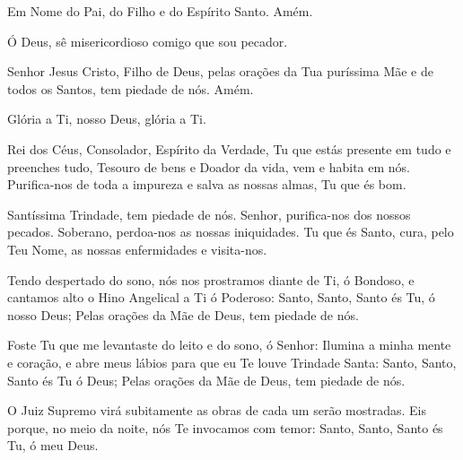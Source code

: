 \documentclass{subfiles}
\begin{document}
\pagestyle{empty}
{\centering}
\pagestyle{headings}

 
Em Nome do Pai, do Filho e do Espírito Santo. Amém. 
 
 
Ó Deus, sê misericordioso comigo que sou pecador. 
  
Senhor Jesus Cristo, Filho de Deus, pelas orações da Tua puríssima Mãe 
e de todos os Santos, tem piedade de nós. Amém. 
 
Glória a Ti, nosso Deus, glória a Ti. 
 
Rei dos Céus, Consolador, Espírito da Verdade, Tu que estás presente 
em tudo e preenches tudo, Tesouro de bens e Doador da vida, vem e habita 
em nós. Purifica-nos de toda a impureza e salva as nossas almas, Tu que és 
bom. 
 
\trisagion{} \thrice{}

Santíssima Trindade, tem piedade de nós. Senhor, purifica-nos dos 
nossos pecados. Soberano, perdoa-nos as nossas iniquidades. Tu que és Santo, 
cura, pelo Teu Nome, as nossas enfermidades e visita-nos.
 
\mercy{} 

\Doxology{}
 
\ourFather{}


Tendo despertado do sono, nós nos prostramos diante de Ti, ó 
Bondoso, e cantamos alto o Hino Angelical a Ti ó Poderoso: Santo, Santo, Santo 
és Tu, ó nosso Deus; Pelas orações da Mãe de Deus, tem piedade de nós. 
 
\doxology{}

Foste Tu que me levantaste do leito e do sono, ó Senhor: Ilumina a minha mente e
coração, e abre meus lábios para que eu Te louve Trindade Santa: Santo, Santo,
Santo és Tu ó Deus; Pelas orações da Mãe de Deus, tem piedade de nós. 
 
\nowandever{}

O Juiz Supremo virá subitamente as obras de cada um serão mostradas. Eis porque,
no meio da noite, nós Te invocamos com temor: Santo, Santo, Santo és Tu, ó meu
Deus. 
\end{document}
